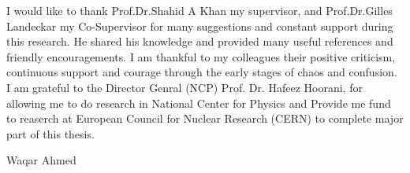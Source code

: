 
\def\baselinestretch{0.5}

I would like to thank Prof.Dr.Shahid A Khan my supervisor,
and Prof.Dr.Gilles Landeckar my Co-Supervisor for
many suggestions and constant support during this
research. He shared his knowledge and provided many useful
references and friendly encouragements. I am thankful to my colleagues
their positive criticism, continuous support and courage
through the early stages of chaos and confusion.\\

\indent\smallskip I am grateful to the Director Genral (NCP) Prof. Dr. Hafeez Hoorani, for allowing me to do research in National Center for Physics and Provide me fund to reaserch at European Council for Nuclear Research (CERN) to complete major part of this thesis.\\


\noindent
\begin{flushright}
Waqar Ahmed\\
\end{flushright}


